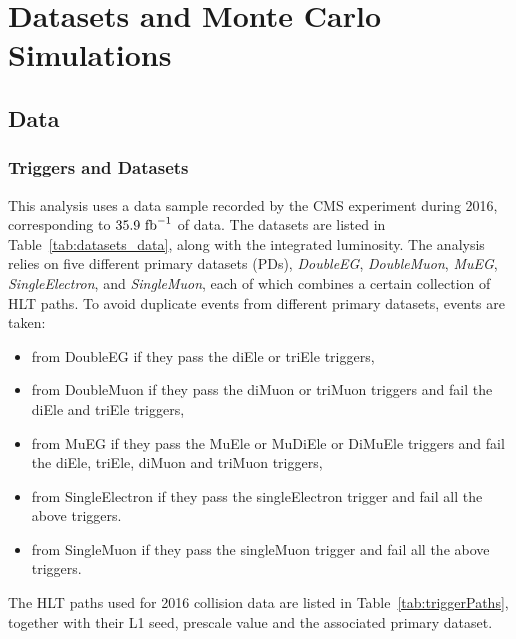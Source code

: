 \chapter{Datasets and Monte Carlo Simulations}

\section{Data}

\subsection{Triggers and Datasets}
\label{sec:trigpaths}

This analysis uses a data sample recorded by the CMS experiment during 2016, corresponding to $35.9\rm{\ fb}^{-1}$ of data. 
The datasets are listed in Table~\ref{tab:datasets_data}, along with the integrated luminosity.  
The analysis relies on five different primary datasets (PDs), 
{\it DoubleEG}, {\it DoubleMuon}, {\it MuEG}, {\it SingleElectron}, and {\it SingleMuon},
each of which combines a certain collection of HLT paths. 
To avoid duplicate events from different primary datasets, events are taken:
\begin{itemize}
\item from DoubleEG if they pass the diEle or triEle triggers,
\item from DoubleMuon if they pass the diMuon or triMuon triggers and fail the diEle and triEle triggers,
\item from MuEG if they pass the MuEle or MuDiEle or DiMuEle triggers and fail the diEle, triEle, diMuon and triMuon triggers,
\item from SingleElectron if they pass the singleElectron trigger and fail all the above triggers. 
\item from SingleMuon if they pass the singleMuon trigger and fail all the above triggers. 
\end{itemize} 

The HLT paths used for 2016 collision data are listed in Table~\ref{tab:triggerPaths}, 
together with their L1 seed, prescale value and the associated primary dataset.


